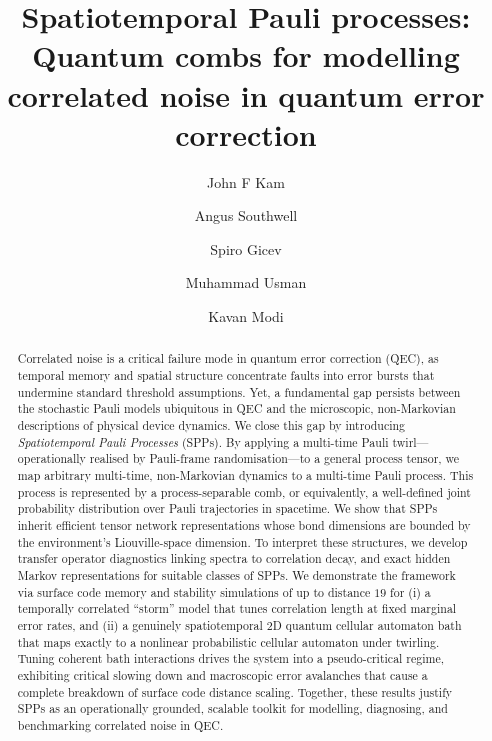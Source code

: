 \documentclass[a4paper,onecolumn,11pt,unpublished]{quantumarticle}
\theoremstyle{definition}
\theoremstyle{definition}
\begin{document}
\title{Spatiotemporal Pauli processes: Quantum combs for modelling correlated noise in quantum error correction}

\author{John F Kam}
\author{Angus Southwell}
\author{Spiro Gicev}
\author{Muhammad Usman}
\author{Kavan Modi}

\begin{abstract}
  \noindent Correlated noise is a critical failure mode in quantum error correction (QEC), as temporal memory and spatial structure concentrate faults into error bursts that undermine standard threshold assumptions. Yet, a fundamental gap persists between the stochastic Pauli models ubiquitous in QEC and the microscopic, non-Markovian descriptions of physical device dynamics. We close this gap by introducing \emph{Spatiotemporal Pauli Processes} (SPPs). By applying a multi-time Pauli twirl---operationally realised by Pauli-frame randomisation---to a general process tensor, we map arbitrary multi-time, non-Markovian dynamics to a multi-time Pauli process. This process is represented by a process-separable comb, or equivalently, a well-defined joint probability distribution over Pauli trajectories in spacetime. We show that SPPs inherit efficient tensor network representations whose bond dimensions are bounded by the environment's Liouville-space dimension. To interpret these structures, we develop transfer operator diagnostics linking spectra to correlation decay, and exact hidden Markov representations for suitable classes of SPPs. We demonstrate the framework via surface code memory and stability simulations of up to distance \(19\) for (i) a temporally correlated ``storm'' model that tunes correlation length at fixed marginal error rates, and (ii) a genuinely spatiotemporal 2D quantum cellular automaton bath that maps exactly to a nonlinear probabilistic cellular automaton under twirling. Tuning coherent bath interactions drives the system into a pseudo-critical regime, exhibiting critical slowing down and macroscopic error avalanches that cause a complete breakdown of surface code distance scaling. Together, these results justify SPPs as an operationally grounded, scalable toolkit for modelling, diagnosing, and benchmarking correlated noise in QEC.
\end{abstract}
\end{document}
